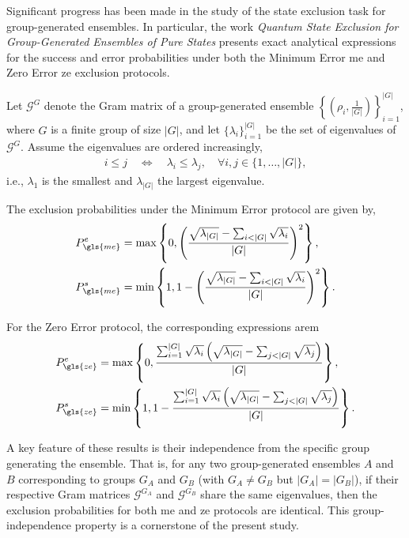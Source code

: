 \documentclass[12pt,letterpaper]{article}
\begin{document}
\begin{multicols}{2}
Significant progress has been made in the study of the state exclusion task for group-generated ensembles. In particular, the work \emph{Quantum State Exclusion for Group-Generated Ensembles of Pure States}\cite{MainPaper} presents exact analytical expressions for the success and error probabilities under both the Minimum Error \gls{me} and Zero Error \gls{ze} exclusion protocols.

Let $\mathcal{G}^G$ denote the Gram matrix of a group-generated ensemble $\left\{ \left( \rho_i, \frac{1}{|G|} \right) \right\}_{i=1}^{|G|}$, where $G$ is a finite group of size $|G|$, and let $\{\lambda_i\}_{i=1}^{|G|}$ be the set of eigenvalues of $\mathcal{G}^G$. Assume the eigenvalues are ordered increasingly,
\begin{align*}
	i \leq j \quad \Leftrightarrow \quad \lambda_i \leq \lambda_j, \quad \forall i,j \in \{1, \dots, |G|\},
\end{align*}
i.e., $\lambda_1$ is the smallest and $\lambda_{|G|}$ the largest eigenvalue.

The exclusion probabilities under the Minimum Error protocol are given by,
\begin{align*}
	P_{\gls{me}}^e &= \max\left\{ 0, \left( \frac{ \sqrt{\lambda_{|G|}} - \sum_{i<|G|} \sqrt{\lambda_i} }{|G|} \right)^2 \right\}, \\
	P_{\gls{me}}^s &= \min\left\{ 1, 1 - \left( \frac{ \sqrt{\lambda_{|G|}} - \sum_{i<|G|} \sqrt{\lambda_i} }{|G|} \right)^2 \right\}.
\end{align*}

For the Zero Error protocol, the corresponding expressions arem
\begin{align*}
	P_{\gls{ze}}^e &= \max\left\{ 0, \frac{ \sum_{i=1}^{|G|} \sqrt{\lambda_i} \left( \sqrt{\lambda_{|G|}} - \sum_{j<|G|} \sqrt{\lambda_j} \right) }{|G|} \right\}, \\
	P_{\gls{ze}}^s &= \min\left\{ 1, 1 - \frac{ \sum_{i=1}^{|G|} \sqrt{\lambda_i} \left( \sqrt{\lambda_{|G|}} - \sum_{j<|G|} \sqrt{\lambda_j} \right) }{|G|} \right\}.
\end{align*}

A key feature of these results is their independence from the specific group generating the ensemble. That is, for any two group-generated ensembles $A$ and $B$ corresponding to groups $G_A$ and $G_B$ (with $G_A \neq G_B$ but $|G_A| = |G_B|$), if their respective Gram matrices $\mathcal{G}^{G_A}$ and $\mathcal{G}^{G_B}$ share the same eigenvalues, then the exclusion probabilities for both \gls{me} and \gls{ze} protocols are identical. This group-independence property is a cornerstone of the present study.


\end{multicols}
\end{document}
